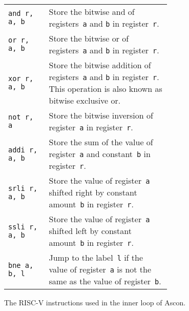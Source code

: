 \begin{figure}
\begin{tabular}{l p{0.75\linewidth}}
       \texttt{and r, a, b} & Store the bitwise and of registers~\texttt{a} and
        \texttt{b} in register~\texttt{r}.
    \\ \texttt{or r, a, b} & Store the bitwise or of registers~\texttt{a} and
        \texttt{b} in register~\texttt{r}.
    \\ \texttt{xor r, a, b} & Store the bitwise addition of registers~\texttt{a}
        and \texttt{b} in register~\texttt{r}. This operation is also known as
        bitwise exclusive or.
    \\ \texttt{not r, a} & Store the bitwise inversion of register~\texttt{a} in
        register~\texttt{r}.
    \\ \texttt{addi r, a, b} & Store the sum of the value of register~\texttt{a}
        and constant~\texttt{b} in register~\texttt{r}.
    \\ \texttt{srli r, a, b} & Store the value of register~\texttt{a} shifted
        right by constant amount~\texttt{b} in register~\texttt{r}.
    \\ \texttt{ssli r, a, b} & Store the value of register~\texttt{a} shifted
        left by constant amount~\texttt{b} in register~\texttt{r}.
    \\ \texttt{bne a, b, l} & Jump to the label~\texttt{l} if the value of
        register~\texttt{a} is not the same as the value of register~\texttt{b}.
\end{tabular}

\caption{The RISC-V instructions used in the inner loop of Ascon.}

\label{opcodes}
\end{figure}
